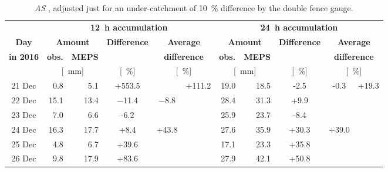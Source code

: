 \begin{table}[!t]
	\begin{center}
		\caption{ \textit{AS }, adjusted just for an under-catchment of \SI{10}{\percent} difference by the double fence gauge. }\label{tab:res:MEPS_err_10}
		\begin{tabular}{c||r|r|c|c|c||r|r|c|c|c}
			\hline \hline
			& \multicolumn{5}{c||}{\textbf{\SI{12}{\hour} accumulation}} & \multicolumn{5}{c}{\textbf{\SI{24}{\hour} accumulation}}    \\ \cline{2-11}
			\textbf{Day} & \multicolumn{2}{c|}{\textbf{Amount}} & \textbf{Difference} & \multicolumn{2}{c||}{\textbf{Average}} &  \multicolumn{2}{c|}{\textbf{Amount}} & \textbf{Difference} & \multicolumn{2}{c}{\textbf{Average}}  \\\cline{2-3} \cline{7-8}
			\textbf{in 2016} & \textbf{obs.} & \textbf{MEPS} & & \multicolumn{2}{c||}{\textbf{difference}} & \textbf{obs.} & \textbf{MEPS} & & \multicolumn{2}{c}{\textbf{difference}} \\\cline{2-11}
			& \multicolumn{2}{c|}{[\SI{}{\mm}]} & [\SI{}{\percent}] & \multicolumn{2}{c||}{ [\SI{}{\percent}]} & \multicolumn{2}{c|}{[\SI{}{\mm}]} & [\SI{}{\percent}] & \multicolumn{2}{c}{ [\SI{}{\percent}]} \\ \hline\hline
			\num{21} Dec & \num{0.8} & \num{5.1} & +\num{553.5} &  &\multirow{6}{*}{+\num{111.2}} & \num{19.0} & \num{18.5} & -\num{2.5} & \multirow{3}{*}{-\num{0.3}}& \multirow{6}{*}{+\num{19.3}}   \\\cline{1-5}\cline{7-9} 
			\num{22} Dec & \num{15.1} & \num{13.4} & \num{-11.4} & \multirow{2}{*}{\num{-8.8}} & & \num{28.4} & \num{31.3} & +\num{9.9} &  &  \\\cline{1-4}\cline{7-9}
			\num{23} Dec & \num{7.0} & \num{6.6} & -\num{6.2} & & & \num{25.9} & \num{23.7} & -\num{8.4} &  &  \\\cline{1-5}\cline{7-10}
			\num{24} Dec & \num{16.3} & \num{17.7} & +\num{8.4} & \multirow{3}{*}{+\num{43.8}} & & \num{27.6} & \num{35.9} & +\num{30.3} & \multirow{3}{*}{+\num{39.0}}  &  \\\cline{1-4}\cline{7-9}
			\num{25} Dec & \num{4.8} & \num{6.7} & +\num{39.6} & & & \num{17.1} & \num{23.3} & +\num{35.8} & &   \\\cline{1-4}\cline{7-9}
			\num{26} Dec & \num{9.8} & \num{17.9} & +\num{83.6} & & & \num{27.9} & \num{42.1} & +\num{50.8} &  &  \\\hline\hline
		\end{tabular}
	\end{center}
\end{table}

